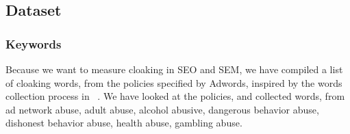 %
%
%                                       
%
%
%
%
%
%
%
%
%
%


\subsection{Dataset}
\subsubsection{Keywords}
Because we want to measure cloaking in SEO and SEM, we have compiled a list of
cloaking words, from the policies specified by Adwords, inspired by the words
collection process in ~\cite{wang2011cloak}. We have looked at the policies, and
collected  words, from ad network abuse, adult abuse, alcohol abusive, dangerous behavior
abuse, dishonest behavior abuse, health abuse, gambling abuse.


